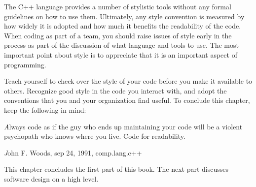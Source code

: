 The C++ language provides a number of stylistic tools without any formal guidelines on how to use them. Ultimately, any style convention is measured by how widely it is adopted and how much it benefits the readability of the code. When coding as part of a team, you should raise issues of style early in the process as part of the discussion of what language and tools to use.
The most important point about style is to appreciate that it is an important aspect of programming.

Teach yourself to check over the style of your code before you make it available to others. Recognize good style in the code you interact with, and adopt the conventions that you and your organization find useful.
To conclude this chapter, keep the following in mind:

\begin{center}
\textit
Always code as if the guy who ends up maintaining your code will be a violent psychopath who knows where you live. Code for readability.
\end{center}

\begin{flushright}
\textit
John F. Woods, sep 24, 1991, comp.lang.c++
\end{flushright}

This chapter concludes the first part of this book. The next part discusses software design on a high level.